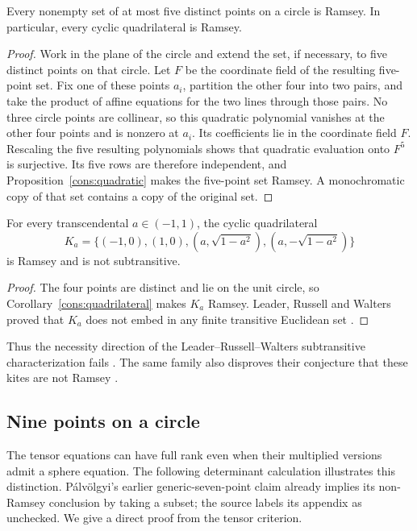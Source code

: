 \begin{corollary}\label{cons:quadrilateral}
Every nonempty set of at most five distinct points on a circle is Ramsey.
In particular, every cyclic quadrilateral is Ramsey.
\end{corollary}
\begin{proof}
Work in the plane of the circle and extend the set, if necessary, to
five distinct points on that circle. Let $F$ be the coordinate field of
the resulting five-point set. Fix one of these points $a_i$, partition
the other four into two pairs, and take the product of affine equations for the two lines
through those pairs. No three circle points are collinear, so this
quadratic polynomial vanishes at the other four points and is nonzero
at $a_i$. Its coefficients lie in the coordinate field $F$. Rescaling
the five resulting polynomials shows that quadratic evaluation onto
$F^5$ is surjective. Its five rows are therefore independent, and
Proposition~\ref{cons:quadratic} makes the five-point set Ramsey.
A monochromatic copy of that set contains a copy of the original set.
\end{proof}

\begin{corollary}\label{cons:kites}
For every transcendental $a\in(-1,1)$, the cyclic quadrilateral
\[
 K_a=\bigl\{(-1,0),(1,0),
             (a,\sqrt{1-a^2}),(a,-\sqrt{1-a^2})\bigr\}
\]
is Ramsey and is not subtransitive.
\end{corollary}
\begin{proof}
The four points are distinct and lie on the unit circle, so
Corollary~\ref{cons:quadrilateral} makes $K_a$ Ramsey.
Leader, Russell and Walters proved that $K_a$ does not embed in any
finite transitive Euclidean set \cite[Corollary~2]{lrw-kites}.
\end{proof}

Thus the necessity direction of the Leader--Russell--Walters
subtransitive characterization fails \cite[Conjecture~A]{lrw-transitive}.
The same family also disproves their conjecture that these kites are
not Ramsey \cite[Conjecture~3]{lrw-kites}.

\subsection{Nine points on a circle}

The tensor equations can have full rank even when their multiplied
versions admit a sphere equation. The following determinant calculation
illustrates this distinction. P\'alv\"olgyi's earlier generic-seven-point
claim \cite[Theorem~A.3]{palvolgyi-heptagon} already implies its
non-Ramsey conclusion by taking a subset; the source labels its appendix
as unchecked. We give a direct proof from the tensor criterion.

